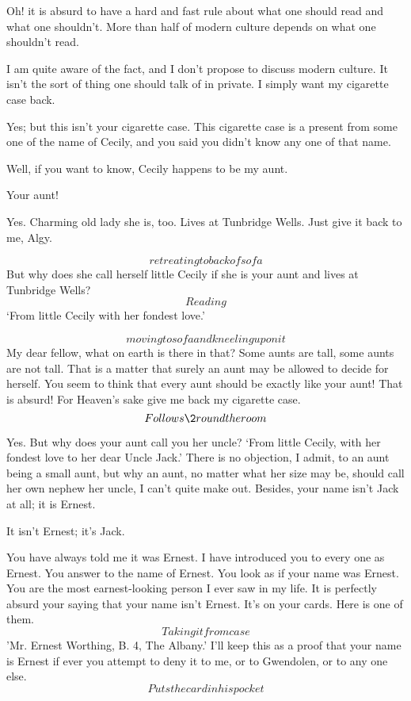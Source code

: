 \documentclass{book}
\begin{document}
\2  Oh! it is absurd to have a hard and fast rule about what
one should read and what one shouldn't.  More than half of modern
culture depends on what one shouldn't read.

\1  I am quite aware of the fact, and I don't propose to discuss
modern culture.  It isn't the sort of thing one should talk of in
private.  I simply want my cigarette case back.

\2  Yes; but this isn't your cigarette case.  This cigarette
case is a present from some one of the name of Cecily, and you said
you didn't know any one of that name.

\1  Well, if you want to know, Cecily happens to be my aunt.

\2  Your aunt!

\1  Yes.  Charming old lady she is, too.  Lives at Tunbridge
Wells.  Just give it back to me, Algy.

\2  \[retreating to back of sofa\]  But why does she call
herself little Cecily if she is your aunt and lives at Tunbridge
Wells?  \[Reading\]  `From little Cecily with her fondest love.'

\1  \[moving to sofa and kneeling upon it\]  My dear fellow, what
on earth is there in that?  Some aunts are tall, some aunts are not
tall.  That is a matter that surely an aunt may be allowed to
decide for herself.  You seem to think that every aunt should be
exactly like your aunt!  That is absurd!  For Heaven's sake give me
back my cigarette case.  \[Follows \2 round the room\]

\2  Yes.  But why does your aunt call you her uncle?  `From
little Cecily, with her fondest love to her dear Uncle Jack.'
There is no objection, I admit, to an aunt being a small aunt, but
why an aunt, no matter what her size may be, should call her own
nephew her uncle, I can't quite make out.  Besides, your name isn't
Jack at all; it is Ernest.

\1  It isn't Ernest; it's Jack.

\2  You have always told me it was Ernest.  I have
introduced you to every one as Ernest.  You answer to the name of
Ernest.  You look as if your name was Ernest.  You are the most
earnest-looking person I ever saw in my life.  It is perfectly
absurd your saying that your name isn't Ernest.  It's on your
cards.  Here is one of them.  \[Taking it from case\]  'Mr. Ernest
Worthing, B. 4, The Albany.'  I'll keep this as a proof that your
name is Ernest if ever you attempt to deny it to me, or to
Gwendolen, or to any one else.  \[Puts the card in his pocket\]
\end{document}
